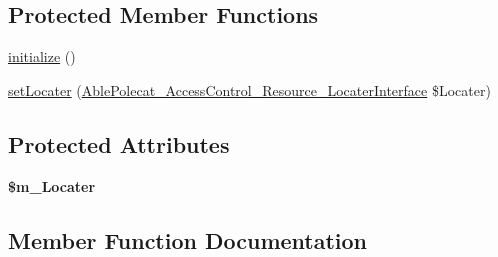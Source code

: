 \subsection*{Protected Member Functions}
\begin{DoxyCompactItemize}
\item 
\hyperlink{class_able_polecat___access_control___resource___file_abstract_a91098fa7d1917ce4833f284bbef12627}{initialize} ()
\item 
\hyperlink{class_able_polecat___access_control___resource___file_abstract_a0865e167e6bb57e52c5df16037dad17d}{set\+Locater} (\hyperlink{interface_able_polecat___access_control___resource___locater_interface}{Able\+Polecat\+\_\+\+Access\+Control\+\_\+\+Resource\+\_\+\+Locater\+Interface} \$Locater)
\end{DoxyCompactItemize}
\subsection*{Protected Attributes}
\begin{DoxyCompactItemize}
\item 
\hypertarget{class_able_polecat___access_control___resource___file_abstract_a324820c7f0dcf4761690f96da8272d53}{}{\bfseries \$m\+\_\+\+Locater}\label{class_able_polecat___access_control___resource___file_abstract_a324820c7f0dcf4761690f96da8272d53}

\end{DoxyCompactItemize}


\subsection{Member Function Documentation}
\hypertarget{class_able_polecat___access_control___resource___file_abstract_a66e49cc03d1511ec4c0290ffaa688079}{}
